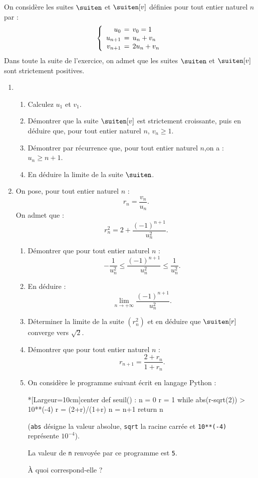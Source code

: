 On considère les suites $\suiten$ et $\suiten[v]$ définies pour tout entier naturel $n$ par : \[\left\lbrace\begin{array}{r@{\:\:=\:\:}l} u_0&v_0=1\\u_{n+1}&u_n+v_n\\v_{n+1}&2u_n+v_n \end{array}\right.\]
Dans toute la suite de l’exercice, on admet que les suites $\suiten$ et $\suiten[v]$ sont strictement positives.

\begin{enumerate}
	\item 
	\begin{enumerate}
		\item Calculez $u_1$ et $v_1$.
		\item Démontrer que la suite $\suiten[v]$ est strictement croissante, puis en déduire que, pour tout entier naturel $n$, $v_n \geqslant 1$.
		\item Démontrer par récurrence que, pour tout entier naturel $n$,on a : $u_n \geqslant n+1$.
		\item En déduire la limite de la suite $\suiten$.
	\end{enumerate}
	\item On pose, pour tout entier naturel $n$ : \[r_n=\dfrac{v_n}{u_n}.\]
	On admet que : \[r_n^2=2+\dfrac{(-1)^{n+1}}{u_n^2}.\]
	\begin{enumerate}
		\item Démontrer que pour tout entier naturel $n$ : \[-\dfrac{1}{u_n^2} \leqslant \dfrac{(-1)^{n+1}}{u_n^2} \leqslant \dfrac{1}{u_n^2}.\]
		\item En déduire : \[\lim_{n \to +\infty} \dfrac{(-1)^{n+1}}{u_n^2}.\]
		\item Déterminer la limite de la suite $\left(r_n^2\right)$ et en déduire que $\suiten[r]$ converge vers $\sqrt{2}$.
		\item Démontrer que pour tout entier naturel $n$ : \[r_{n+1}=\dfrac{2+r_n}{1+r_n}.\]
		\item On considère le programme suivant écrit en langage \textsf{Python} :
\begin{CodePythonLstAlt}*[Largeur=10cm]{center}
def seuil() :
	n = 0
	r = 1
	while abs(r-sqrt(2)) > 10**(-4)
		r = (2+r)/(1+r)
		n = n+1
	return n
\end{CodePythonLstAlt}
		(\texttt{abs} désigne la valeur absolue, \texttt{sqrt} la racine carrée et \texttt{10**(-4)} représente $10^{-4}$).
		
		La valeur de \texttt{n} renvoyée par ce programme est \texttt{5}.
		
		À quoi correspond-elle ?
	\end{enumerate}
\end{enumerate}

